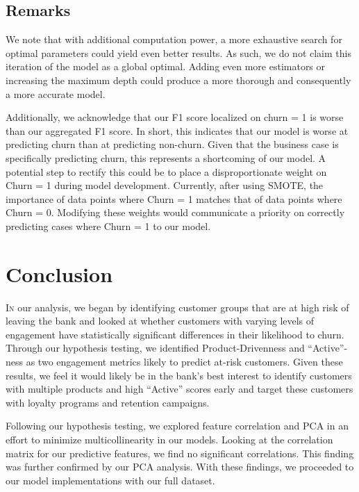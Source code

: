 \documentclass[twoside,twocolumn]{article}
\begin{document}
\subsection*{Remarks}
We note that with additional computation power, a more exhaustive search for optimal parameters could yield even better results. As such, we do not claim this iteration of the model as a global optimal. Adding even more estimators or increasing the maximum depth could produce a more thorough and consequently a more accurate model. 

Additionally, we acknowledge that our F1 score localized on churn = 1 is worse than our aggregated F1 score. In short, this indicates that our model is worse at predicting churn than at predicting non-churn. Given that the business case is specifically predicting churn, this represents a shortcoming of our model. A potential step to rectify this could be to place a disproportionate weight on Churn = 1 during model development. Currently, after using SMOTE, the importance of data points where Churn = 1 matches that of data points where Churn = 0. Modifying these weights would communicate a priority on correctly predicting cases where Churn = 1 to our model. 
    





\section{Conclusion}

\lettrine[nindent=0em,lines=2]{I}n our analysis, we began by identifying customer groups that are at high risk of leaving the bank and looked at whether customers with varying levels of engagement have statistically significant differences in their likelihood to churn. Through our hypothesis testing, we identified Product-Drivenness and “Active”-ness as two engagement metrics likely to predict at-risk customers.  Given these results, we feel it would likely be in the bank's best interest to identify customers with multiple products and high ``Active'' scores early and target these customers with loyalty programs and retention campaigns.

Following our hypothesis testing, we explored feature correlation and PCA in an effort to minimize multicollinearity in our models.  Looking at the correlation matrix for our predictive features, we find no significant correlations.  This finding was further confirmed by our PCA analysis.  With these findings, we proceeded to our model implementations with our full dataset.
\end{document}
